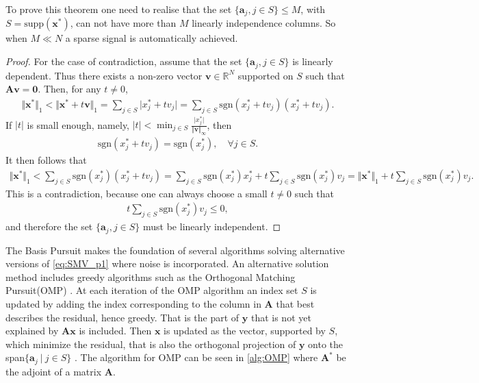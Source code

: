 To prove this theorem one need to realise that the set $\lbrace \mathbf{a}_j, j \in S \rbrace \leq M$, with $S = \text{supp}(\mathbf{x}^\ast)$, can not have more than $M$ linearly independence columns. 
So when $M \ll N$ a sparse signal is automatically achieved.
\begin{proof}
For the case of contradiction, assume that the set $\lbrace \mathbf{a}_j, j \in S \rbrace$ is linearly dependent. 
Thus there exists a non-zero vector $\mathbf{v} \in \mathbb{R}^N$ supported on $S$ such that $\mathbf{Av} = \textbf{0}$. Then, for any $t \neq 0$,
\begin{align*}
\Vert \mathbf{x}^\ast \Vert_1 < \Vert \mathbf{x}^\ast + t \mathbf{v} \Vert_1 = \sum_{j \in S} \vert x_j^\ast + t v_j \vert = \sum_{j \in S} \text{sgn}(x_j^\ast + t v_j )(x_j^\ast + t v_j ).
\end{align*}
If $|t|$ is small enough, namely, $|t| < \min_{j \in S} \frac{\vert x_j^\ast \vert}{\Vert \mathbf{v} \Vert_{\infty}}$, then
\begin{align*}
\text{sgn}(x_j^\ast + t v_j) = \text{sgn}(x_j^\ast), \quad \forall j \in S.
\end{align*}
It then follows that
\begin{align*}
\Vert \textbf{x}^{\ast} \Vert_1 < \sum_{j \in S} \text{sgn}(x_j^{\ast})(x_j^{\ast} + t v_j ) = \sum_{j \in S} \text{sgn}(x_j^{\ast})x_j^{\ast} + t \sum_{j \in S} \text{sgn}(x_j^{\ast})v_j = \Vert \textbf{x}^{\ast} \Vert_1 + t \sum_{j \in S} \text{sgn}(x_j^{\ast})v_j.
\end{align*}
This is a contradiction, because one can always choose a small $t \neq 0$ such that 
\begin{align*}
t \sum_{j \in S} \text{sgn}(x_j^\ast)v_j \leq 0,
\end{align*}
and therefore the set $\lbrace \mathbf{a}_j, j \in S \rbrace$ must be linearly independent.
\end{proof}
The Basis Pursuit makes the foundation of several algorithms solving alternative versions of \eqref{eq:SMV_p1} where noise is incorporated. 
An alternative solution method includes greedy algorithms such as the Orthogonal Matching Pursuit(OMP) \cite[P. 65]{FR}. 
At each iteration of the OMP algorithm an index set $S$ is updated by adding the index corresponding to the column in $\mathbf{A}$ that best describes the residual, hence greedy.
That is the part of $\mathbf{y}$ that is not yet explained by $\mathbf{Ax}$ is included. 
Then $\mathbf{x}$ is updated as the vector, supported by $S$, which minimize the residual, that is also the orthogonal projection of $\mathbf{y}$ onto the span$\lbrace \mathbf{a}_j \ \vert \ j \in S \rbrace$ . The algorithm for OMP can be seen in \ref{alg:OMP} where $\mathbf{A}^\ast$ be the adjoint of a matrix $\mathbf{A}$.
